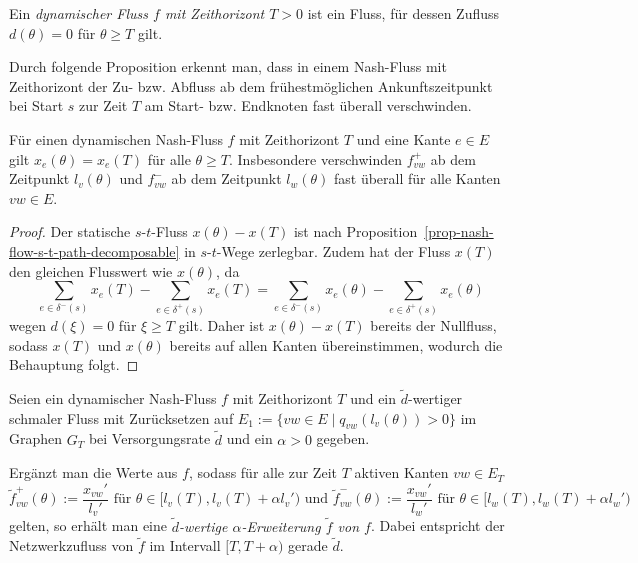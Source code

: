 \begin{definition}
	Ein \emph{dynamischer Fluss $f$ mit Zeithorizont $T>0$} ist ein Fluss, für dessen Zufluss $d(\theta)= 0$ für $\theta\geq T$ gilt.
\end{definition}

Durch folgende Proposition erkennt man, dass in einem Nash-Fluss mit Zeithorizont der Zu- bzw. Abfluss ab dem frühestmöglichen Ankunftszeitpunkt bei Start $s$ zur Zeit $T$ am Start- bzw. Endknoten fast überall verschwinden.

\begin{proposition}
Für einen dynamischen Nash-Fluss $f$ mit Zeithorizont $T$ und eine Kante $e\in E$ gilt $x_{e}(\theta) = x_{e}(T)$ für alle $\theta \geq T$.
Insbesondere verschwinden $f_{vw}^+$ ab dem Zeitpunkt $l_v(\theta)$ und $f_{vw}^-$ ab dem Zeitpunkt $l_w(\theta)$ fast überall für alle Kanten $vw\in E$.
\end{proposition}
\begin{proof}
	Der statische $s$-$t$-Fluss $x(\theta) -x(T)$ ist nach Proposition~\ref{prop-nash-flow-s-t-path-decomposable} in $s$-$t$-Wege zerlegbar.
	Zudem hat der Fluss $x(T)$ den gleichen Flusswert wie $x(\theta)$, da
	\[ \sum_{e\in \delta^-(s)} x_e(T) - \sum_{e\in\delta^+(s)} x_e(T) = \sum_{e\in \delta^-(s)} x_e(\theta) - \sum_{e\in\delta^+(s)} x_e(\theta)\]
	wegen $d(\xi) = 0$ für $\xi \geq T $ gilt.
	Daher ist $x(\theta)- x(T)$ bereits der Nullfluss, sodass $x(T)$ und $x(\theta)$ bereits auf allen Kanten übereinstimmen, wodurch die Behauptung folgt.
\end{proof}

\begin{definition}
	Seien ein dynamischer Nash-Fluss $f$ mit Zeithorizont $T$ und ein $\tilde{d}$-wertiger schmaler Fluss mit Zurücksetzen auf $E_1 := \{ vw\in E \mid q_{vw}(l_v(\theta)) > 0 \} $ im Graphen $G_T$ bei Versorgungsrate $\tilde{d}$ und ein $\alpha > 0$ gegeben.
	
	Ergänzt man die Werte aus $f$, sodass für alle zur Zeit $T$ aktiven Kanten $vw\in E_T$
	\[ \tilde{f}_{vw}^+(\theta):= \frac{x_{vw}'}{l_v'} \text{ für $\theta\in [l_v(T), l_v(T)+\alpha l_v')$ und } \tilde{f}_{vw}^-(\theta):=\frac{x_{vw}'}{l_w'} \text{ für $\theta\in [l_w(T), l_w(T)+\alpha l_w')$} \]
	gelten, so erhält man eine \emph{$\tilde{d}$-wertige $\alpha$-Erweiterung $\tilde{f}$ von $f$}.
	Dabei entspricht der Netzwerkzufluss von $\tilde{f}$ im Intervall $[T, T+\alpha)$ gerade $\tilde{d}$.
\end{definition}

